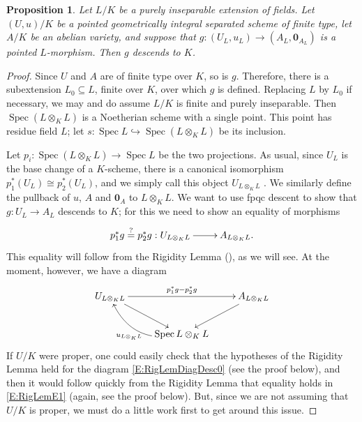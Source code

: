 \documentclass[11pt, reqno]{amsart}
\numberwithin{equation}{section}
\newtheorem{pro}[teo]{Proposition}
\theoremstyle{definition}
\theoremstyle{remark}
\def\iso{\cong}
\DeclareMathOperator{\spec}{Spec}
\begin{document}
   
\begin{pro}
  \label{L:rigidity}
Let $L/K$ be a purely inseparable extension of fields. Let $(U,u)/K$ be a
 pointed geometrically integral 
separated scheme of finite type, let $A/K$ be an abelian
variety, and suppose that   
$g:(U_L, u_L) \to (A_L, \mathbf 0_{A_L})$ is a pointed $L$-morphism.  Then $g$
descends to $K$.
\end{pro}



\begin{proof}
	   Since $U$ and $A$ are of finite type over $K$, so is $g$.  
    Therefore, 
   there is a subextension $L_0 \subseteq L$,
  finite over $K$, over which $g$ is defined.  Replacing $L$ by $L_0$
  if necessary, we may and do assume $L/K$ is finite and purely
inseparable.  Then $\spec(L\otimes_KL)$ is a Noetherian scheme with a
single point.  This point has residue field $L$; let $s: \spec L
\hookrightarrow \spec(L\otimes_KL)$ be its inclusion.

Let $p_i: \spec(L\otimes_KL) \to \spec L$ be the two projections.  As
usual, since $U_L$ is the base change of a $K$-scheme, there is a
canonical isomorphism $p_1^*(U_L) \iso p_2^*(U_L)$, and we simply call
this object $U_{L\otimes_KL}$ .  We similarly define the pullback of
$u$, $A$ and $\mathbf 0_A$ to $L\otimes_KL$.  
      We want to use fpqc descent to show that $g:U_L\to A_L$ descends to $K$; for this we need to show an equality
of morphisms
\begin{equation}\label{E:RigLemE1}
\xymatrix{
p_1^*g \stackrel?=p_2^*g: U_{L\otimes_KL}\ar[r] & A_{L\otimes_KL}.}
\end{equation}
This equality will follow from the Rigidity Lemma (), as we will see.  At the moment, however, we have a diagram
\begin{equation}\label{E:RigLemDiagDesc0}
\xymatrix{
 U_{L\otimes_KL} \ar[rr]^{p_1^*g - p_2^* g} \ar[dr]^{} & &A_{L\otimes_KL}\ar[dl]^{} \\
& \spec L\otimes_KL \ar@/^1.5pc/[ul]^{u_{L\otimes_KL}} & 
}
\end{equation}
If $U/K$ were proper, one could easily check that the hypotheses of the Rigidity Lemma held for the diagram \eqref{E:RigLemDiagDesc0} (see the proof below), and then it would follow quickly from the Rigidity Lemma that equality holds in \eqref{E:RigLemE1} (again, see the proof below).  But, since we are not assuming that $U/K$ is proper, we must do a little work first to get around this issue.



\end{proof}
\end{document}
